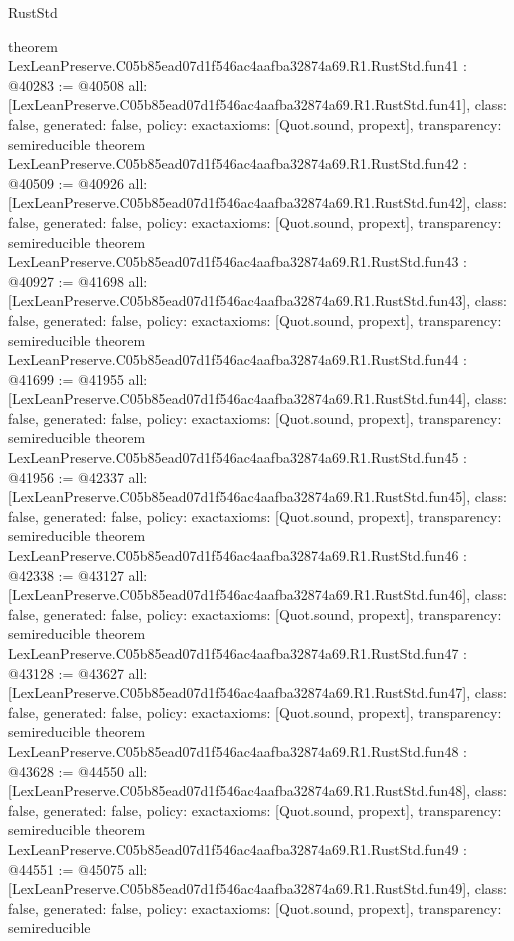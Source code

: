 \begin{lexlean}{RustStd}
\begin{coremodule}
{}
theorem LexLeanPreserve.C05b85ead07d1f546ac4aafba32874a69.R1.RustStd.fun41 : @40283 := @40508 {
  all: [LexLeanPreserve.C05b85ead07d1f546ac4aafba32874a69.R1.RustStd.fun41],
  class: false,
  generated: false,
  policy: exact{axioms: [Quot.sound, propext]},
  transparency: semireducible
}
theorem LexLeanPreserve.C05b85ead07d1f546ac4aafba32874a69.R1.RustStd.fun42 : @40509 := @40926 {
  all: [LexLeanPreserve.C05b85ead07d1f546ac4aafba32874a69.R1.RustStd.fun42],
  class: false,
  generated: false,
  policy: exact{axioms: [Quot.sound, propext]},
  transparency: semireducible
}
theorem LexLeanPreserve.C05b85ead07d1f546ac4aafba32874a69.R1.RustStd.fun43 : @40927 := @41698 {
  all: [LexLeanPreserve.C05b85ead07d1f546ac4aafba32874a69.R1.RustStd.fun43],
  class: false,
  generated: false,
  policy: exact{axioms: [Quot.sound, propext]},
  transparency: semireducible
}
theorem LexLeanPreserve.C05b85ead07d1f546ac4aafba32874a69.R1.RustStd.fun44 : @41699 := @41955 {
  all: [LexLeanPreserve.C05b85ead07d1f546ac4aafba32874a69.R1.RustStd.fun44],
  class: false,
  generated: false,
  policy: exact{axioms: [Quot.sound, propext]},
  transparency: semireducible
}
theorem LexLeanPreserve.C05b85ead07d1f546ac4aafba32874a69.R1.RustStd.fun45 : @41956 := @42337 {
  all: [LexLeanPreserve.C05b85ead07d1f546ac4aafba32874a69.R1.RustStd.fun45],
  class: false,
  generated: false,
  policy: exact{axioms: [Quot.sound, propext]},
  transparency: semireducible
}
theorem LexLeanPreserve.C05b85ead07d1f546ac4aafba32874a69.R1.RustStd.fun46 : @42338 := @43127 {
  all: [LexLeanPreserve.C05b85ead07d1f546ac4aafba32874a69.R1.RustStd.fun46],
  class: false,
  generated: false,
  policy: exact{axioms: [Quot.sound, propext]},
  transparency: semireducible
}
theorem LexLeanPreserve.C05b85ead07d1f546ac4aafba32874a69.R1.RustStd.fun47 : @43128 := @43627 {
  all: [LexLeanPreserve.C05b85ead07d1f546ac4aafba32874a69.R1.RustStd.fun47],
  class: false,
  generated: false,
  policy: exact{axioms: [Quot.sound, propext]},
  transparency: semireducible
}
theorem LexLeanPreserve.C05b85ead07d1f546ac4aafba32874a69.R1.RustStd.fun48 : @43628 := @44550 {
  all: [LexLeanPreserve.C05b85ead07d1f546ac4aafba32874a69.R1.RustStd.fun48],
  class: false,
  generated: false,
  policy: exact{axioms: [Quot.sound, propext]},
  transparency: semireducible
}
theorem LexLeanPreserve.C05b85ead07d1f546ac4aafba32874a69.R1.RustStd.fun49 : @44551 := @45075 {
  all: [LexLeanPreserve.C05b85ead07d1f546ac4aafba32874a69.R1.RustStd.fun49],
  class: false,
  generated: false,
  policy: exact{axioms: [Quot.sound, propext]},
  transparency: semireducible
}
\end{coremodule}
\end{lexlean}
